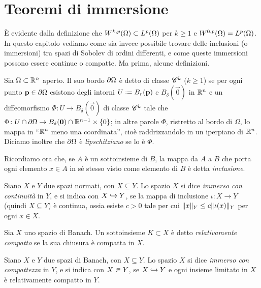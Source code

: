 \section{Teoremi di immersione}
È evidente dalla definizione che $\sobW[k,p]{\Omega}\subset\leb[p]{\Omega}$ per $k\ge 1$ e $\sobW[0,p]{\Omega}=\leb[p]{\Omega}$.
In questo capitolo vediamo come sia invece possibile trovare delle inclusioni (o immersioni) tra spazi di Sobolev di ordini differenti, e come queste immersioni possono essere continue o compatte.
Ma prima, alcune definizioni.
\begin{definizione} \label{d:bordo-regolare}
    Sia $\Omega\subset\R^n$ aperto.
    Il suo bordo $\boundary\Omega$ è detto di classe $\cclass[k]$ ($k\ge 1$) se per ogni punto $\vec p\in\boundary\Omega$ esistono degli intorni $U\defeq B_r(\vec p)$ e $B_\delta(\vec 0)$ in $\R^n$ e un diffeomorfismo $\Phi\colon U\to B_\delta(\vec 0)$ di classe $\cclass[k]$ tale che $\Phi\colon U\cap\boundary\Omega\to B_\delta(\vec 0)\cap\R^{n-1}\times\{0\}$; in altre parole $\Phi$, ristretto al bordo di $\Omega$, lo mappa in ``$\R^n$ meno una coordinata'', cioè raddrizzandolo in un iperpiano di $\R^n$.
    Diciamo inoltre che $\boundary\Omega$ è \emph{lipschitziano} se lo è $\Phi$.
\end{definizione}
Ricordiamo ora che, se $A$ è un sottoinsieme di $B$, la mappa da $A$ a $B$ che porta ogni elemento $x\in A$ in s\'e stesso visto come elemento di $B$ è detta \emph{inclusione}.
\begin{definizione} \label{d:immersione-continua}
    Siano $X$ e $Y$ due spazi normati, con $X\subseteq Y$.
    Lo spazio $X$ si dice \emph{immerso con continuità} in $Y$, e si indica con $X\emb Y$, se la mappa di inclusione $\iota\colon X\to Y$ (quindi $X\subseteq Y$) è continua, ossia esiste $c>0$ tale per cui $\norm{x}_Y\le c\norm{\iota(x)}_Y$ per ogni $x\in X$.
\end{definizione}
\begin{definizione} \label{d:insieme-relativamente-compatto}
    Sia $X$ uno spazio di Banach.
    Un sottoinsieme $K\subset X$ è detto \emph{relativamente compatto} se la sua chiusura è compatta in $X$.
\end{definizione}
\begin{definizione} \label{d:immersione-compatta}
    Siano $X$ e $Y$ due spazi di Banach, con $X\subseteq Y$.
    Lo spazio $X$ si dice \emph{immerso con compattezza} in $Y$, e si indica con $X\cemb Y$, se $X\emb Y$ e ogni insieme limitato in $X$ è relativamente compatto in $Y$.
\end{definizione}
